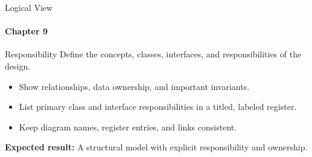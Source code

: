 \begin{frame}{Logical View}
\framesubtitle{Chapter 9}
\begin{block}{Responsibility}
Define the concepts, classes, interfaces, and responsibilities of the design.
\end{block}
\begin{itemize}
  \item Show relationships, data ownership, and important invariants.
  \item List primary class and interface responsibilities in a titled, labeled register.
  \item Keep diagram names, register entries, and links consistent.
\end{itemize}
\vspace{0.15cm}
\textbf{Expected result:} A structural model with explicit responsibility and ownership.
\end{frame}
